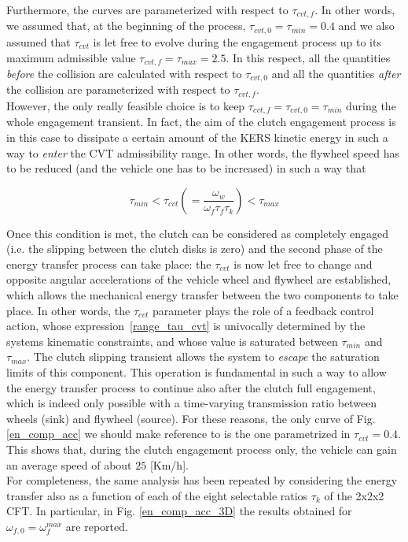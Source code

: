 \documentclass[11pt]{article}
\begin{document}
Furthermore, the curves are parameterized with respect to $\tau_{cvt,f}$. In other words, we assumed that, at the beginning of the process, $\tau_{cvt,0} = \tau_{min} = 0.4$ and we also assumed that $\tau_{cvt}$ is let free to evolve during the engagement process up to its maximum admissible value $\tau_{cvt,f} = \tau_{max} = 2.5$. In this respect, all the quantities \textit{before} the collision are calculated with respect to $\tau_{cvt,0}$ and all the quantities \textit{after} the collision are parameterized with respect to $\tau_{cvt,f}$.\\ However, the only really feasible choice is to keep $\tau_{cvt,f} = \tau_{cvt,0} = \tau_{min}$ during the whole engagement transient. In fact, the aim of the clutch engagement process is in this case to dissipate a certain amount of the KERS kinetic energy in such a way to \textit{enter} the CVT admissibility range. In other words, the flywheel speed has to be reduced (and the vehicle one has to be increased) in such a way that 

\begin{equation}
\tau_{min} < \tau_{cvt} \left(= \frac{\omega_w}{\omega_f \tau_f \tau_k}\right) < \tau_{max}
\label{range_tau_cvt}
\end{equation}
          
Once this condition is met, the clutch can be considered as completely engaged (i.e. the slipping between the clutch disks is zero) and the second phase of the energy transfer process can take place: the $\tau_{cvt}$ is now let free to change and opposite angular accelerations of the vehicle wheel and flywheel are established, which allows the mechanical energy transfer between the two components to take place. In other words, the $\tau_{cvt}$ parameter plays the role of a feedback control action, whose expression~\eqref{range_tau_cvt} is univocally determined by the systems kinematic constraints, and whose value is saturated between $\tau_{min}$ and $\tau_{max}$. The clutch slipping transient allows the system to \textit{escape} the saturation limits of this component. This operation is fundamental in such a way to allow the energy transfer process to continue also after the clutch full engagement, which is indeed only possible with a time-varying transmission ratio between wheels (sink) and flywheel (source). For these reasons, the only curve of Fig. \ref{en_comp_acc} we should make reference to is the one parametrized in $\tau_{cvt}=0.4$. This shows that, during the clutch engagement process only, the vehicle can gain an average speed of about $25$ [Km/h].\\For completeness, the same analysis has been repeated by considering the energy transfer also as a function of each of the eight selectable ratios $\tau_k$ of the 2x2x2 CFT. In particular, in Fig. \ref{en_comp_acc_3D} the results obtained for $\omega_{f,0} = \omega_f^{max}$ are reported. 
\end{document}
